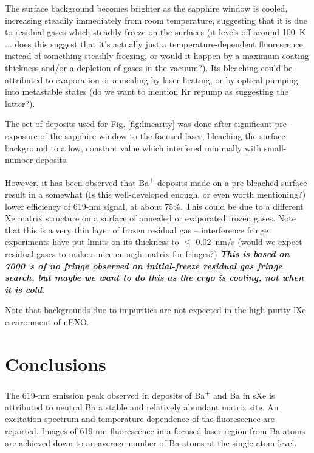 \documentclass[aps,pra,reprint,superscriptaddress]{revtex4-1}
\begin{document}
{The surface background becomes brighter as the sapphire window is cooled, increasing steadily immediately from room temperature, suggesting that it is due to residual gases which steadily freeze on the surfaces {\color{red}(it levels off around 100~K ... does this suggest that it's actually just a temperature-dependent fluorescence instead of something steadily freezing, or would it happen by a maximum coating thickness and/or a depletion of gases in the vacuum?)}.  Its bleaching could be attributed to evaporation or annealing by laser heating, or by optical pumping into metastable states {\color{red}(do we want to mention Kr repump as suggesting the latter?)}.

The set of deposits used for Fig. \ref{fig:linearity} was done after significant pre-exposure of the sapphire window to the focused laser, bleaching the surface background to a low, constant value which interfered minimally with small-number deposits.

However, it has been observed that Ba\textsuperscript{+} deposits made on a pre-bleached surface result in a somewhat {\color{red}(Is this well-developed enough, or even worth mentioning?)} lower efficiency of 619-nm signal, at about 75\%.  This could be due to a different Xe matrix structure on a surface of annealed or evaporated frozen gases.  Note that this is a very thin layer of frozen residual gas -- interference fringe experiments have put limits on its thickness to $\leq$ 0.02~nm/s ({\color{red}would we expect residual gases to make a nice enough matrix for fringes?}) \textbf{\color{red}\emph{This is based on 7000~s of no fringe observed on initial-freeze residual gas fringe search, but maybe we want to do this as the cryo is cooling, not when it is cold}}.

Note that backgrounds due to impurities are not expected in the high-purity lXe environment of nEXO.

\section{Conclusions}

The 619-nm emission peak observed in deposits of Ba\textsuperscript{+} and Ba in sXe is attributed to neutral Ba a stable and relatively abundant matrix site.  An excitation spectrum and temperature dependence of the fluorescence are reported.  Images of 619-nm fluorescence in a focused laser region from Ba atoms are achieved down to an average number of Ba atoms at the single-atom level.

}
\end{document}
